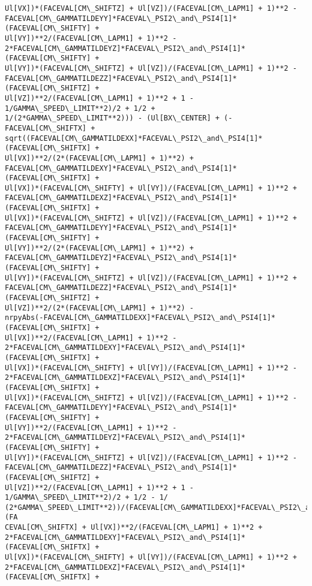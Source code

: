 \documentclass[landscape,letterpaper,10pt,english]{article}
\begin{document}
\begin{Verbatim}[commandchars=\\\{\}]
Ul[VX])*(FACEVAL[CM\_SHIFTZ] + Ul[VZ])/(FACEVAL[CM\_LAPM1] + 1)**2 -
FACEVAL[CM\_GAMMATILDEYY]*FACEVAL\_PSI2\_and\_PSI4[1]*(FACEVAL[CM\_SHIFTY] +
Ul[VY])**2/(FACEVAL[CM\_LAPM1] + 1)**2 -
2*FACEVAL[CM\_GAMMATILDEYZ]*FACEVAL\_PSI2\_and\_PSI4[1]*(FACEVAL[CM\_SHIFTY] +
Ul[VY])*(FACEVAL[CM\_SHIFTZ] + Ul[VZ])/(FACEVAL[CM\_LAPM1] + 1)**2 -
FACEVAL[CM\_GAMMATILDEZZ]*FACEVAL\_PSI2\_and\_PSI4[1]*(FACEVAL[CM\_SHIFTZ] +
Ul[VZ])**2/(FACEVAL[CM\_LAPM1] + 1)**2 + 1 - 1/GAMMA\_SPEED\_LIMIT**2)/2 + 1/2 +
1/(2*GAMMA\_SPEED\_LIMIT**2))) - (Ul[BX\_CENTER] + (-FACEVAL[CM\_SHIFTX] +
sqrt((FACEVAL[CM\_GAMMATILDEXX]*FACEVAL\_PSI2\_and\_PSI4[1]*(FACEVAL[CM\_SHIFTX] +
Ul[VX])**2/(2*(FACEVAL[CM\_LAPM1] + 1)**2) +
FACEVAL[CM\_GAMMATILDEXY]*FACEVAL\_PSI2\_and\_PSI4[1]*(FACEVAL[CM\_SHIFTX] +
Ul[VX])*(FACEVAL[CM\_SHIFTY] + Ul[VY])/(FACEVAL[CM\_LAPM1] + 1)**2 +
FACEVAL[CM\_GAMMATILDEXZ]*FACEVAL\_PSI2\_and\_PSI4[1]*(FACEVAL[CM\_SHIFTX] +
Ul[VX])*(FACEVAL[CM\_SHIFTZ] + Ul[VZ])/(FACEVAL[CM\_LAPM1] + 1)**2 +
FACEVAL[CM\_GAMMATILDEYY]*FACEVAL\_PSI2\_and\_PSI4[1]*(FACEVAL[CM\_SHIFTY] +
Ul[VY])**2/(2*(FACEVAL[CM\_LAPM1] + 1)**2) +
FACEVAL[CM\_GAMMATILDEYZ]*FACEVAL\_PSI2\_and\_PSI4[1]*(FACEVAL[CM\_SHIFTY] +
Ul[VY])*(FACEVAL[CM\_SHIFTZ] + Ul[VZ])/(FACEVAL[CM\_LAPM1] + 1)**2 +
FACEVAL[CM\_GAMMATILDEZZ]*FACEVAL\_PSI2\_and\_PSI4[1]*(FACEVAL[CM\_SHIFTZ] +
Ul[VZ])**2/(2*(FACEVAL[CM\_LAPM1] + 1)**2) -
nrpyAbs(-FACEVAL[CM\_GAMMATILDEXX]*FACEVAL\_PSI2\_and\_PSI4[1]*(FACEVAL[CM\_SHIFTX] +
Ul[VX])**2/(FACEVAL[CM\_LAPM1] + 1)**2 -
2*FACEVAL[CM\_GAMMATILDEXY]*FACEVAL\_PSI2\_and\_PSI4[1]*(FACEVAL[CM\_SHIFTX] +
Ul[VX])*(FACEVAL[CM\_SHIFTY] + Ul[VY])/(FACEVAL[CM\_LAPM1] + 1)**2 -
2*FACEVAL[CM\_GAMMATILDEXZ]*FACEVAL\_PSI2\_and\_PSI4[1]*(FACEVAL[CM\_SHIFTX] +
Ul[VX])*(FACEVAL[CM\_SHIFTZ] + Ul[VZ])/(FACEVAL[CM\_LAPM1] + 1)**2 -
FACEVAL[CM\_GAMMATILDEYY]*FACEVAL\_PSI2\_and\_PSI4[1]*(FACEVAL[CM\_SHIFTY] +
Ul[VY])**2/(FACEVAL[CM\_LAPM1] + 1)**2 -
2*FACEVAL[CM\_GAMMATILDEYZ]*FACEVAL\_PSI2\_and\_PSI4[1]*(FACEVAL[CM\_SHIFTY] +
Ul[VY])*(FACEVAL[CM\_SHIFTZ] + Ul[VZ])/(FACEVAL[CM\_LAPM1] + 1)**2 -
FACEVAL[CM\_GAMMATILDEZZ]*FACEVAL\_PSI2\_and\_PSI4[1]*(FACEVAL[CM\_SHIFTZ] +
Ul[VZ])**2/(FACEVAL[CM\_LAPM1] + 1)**2 + 1 - 1/GAMMA\_SPEED\_LIMIT**2)/2 + 1/2 - 1/
(2*GAMMA\_SPEED\_LIMIT**2))/(FACEVAL[CM\_GAMMATILDEXX]*FACEVAL\_PSI2\_and\_PSI4[1]*(FA
CEVAL[CM\_SHIFTX] + Ul[VX])**2/(FACEVAL[CM\_LAPM1] + 1)**2 +
2*FACEVAL[CM\_GAMMATILDEXY]*FACEVAL\_PSI2\_and\_PSI4[1]*(FACEVAL[CM\_SHIFTX] +
Ul[VX])*(FACEVAL[CM\_SHIFTY] + Ul[VY])/(FACEVAL[CM\_LAPM1] + 1)**2 +
2*FACEVAL[CM\_GAMMATILDEXZ]*FACEVAL\_PSI2\_and\_PSI4[1]*(FACEVAL[CM\_SHIFTX] +

\end{Verbatim}
\end{document}
